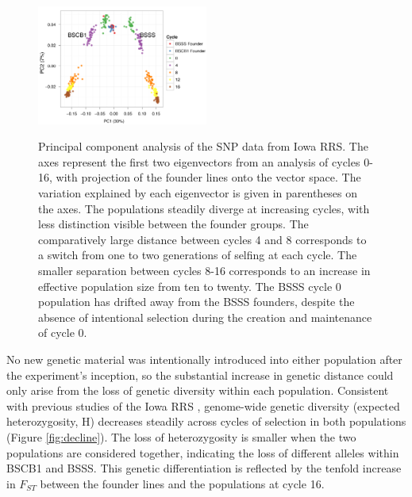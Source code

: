 \begin{figure}[tb]   
  \begin{center}
   \vspace{-0mm}
   \includegraphics[width=0.5\textwidth]{fig1}
   \renewcommand{\baselinestretch}{0.9}
   \vspace{-3mm}
   \caption{Principal component analysis of the SNP data from Iowa RRS. The axes represent the first two eigenvectors from an analysis of cycles 0-16, with projection of the founder lines onto the vector space. The variation explained by each eigenvector is given in parentheses on the axes. The populations steadily diverge at increasing cycles, with less distinction visible between the founder groups. The comparatively large distance between cycles 4 and 8 corresponds to a switch from one to two generations of selfing at each cycle. The smaller separation between cycles 8-16 corresponds to an increase in effective population size from ten to twenty. The BSSS cycle 0 population has drifted away from the BSSS founders, despite the absence of intentional selection during the creation and maintenance of cycle 0.
} 
\vspace{-6mm}
    \label{fig:pca}
  \end{center}
\end{figure}

No new genetic material was intentionally introduced into either population after the experiment's inception, so the substantial increase in genetic distance could only arise from the loss of genetic diversity within each population. 
Consistent with previous studies of the Iowa RRS \citep{messmer1991genetic, labate1997molecular,  hagdorn2003molecular, hinze2005population}, genome-wide genetic diversity (expected heterozygosity, H) decreases steadily across cycles of selection in both populations (Figure \ref{fig:decline}). 
The loss of heterozygosity is smaller when the two populations are considered together, indicating the loss of different alleles within BSCB1 and BSSS. 
This genetic differentiation is reflected by the tenfold increase in $F_{ST}$ between the founder lines and the populations at cycle 16. 

